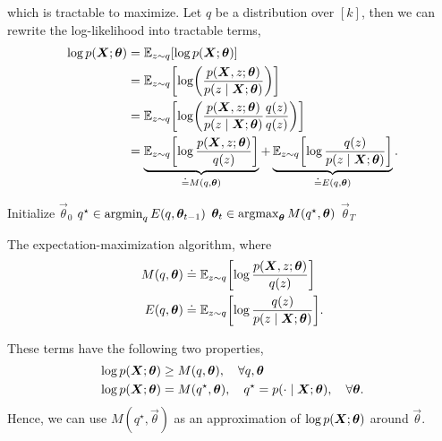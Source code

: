 which is tractable to maximize. Let $q$ be a distribution over $[k]$, then we can rewrite the
log-likelihood into tractable terms,
\begin{align*}
    \log p(\mat{X}; \vec{\theta}) & = \E_{z \sim q} [\log p(\mat{X}; \vec{\theta})]                                                                                                                                                                                            \\
                                  & = \E_{z \sim q} \lft[ \log \lft( \frac{p(\mat{X}, z; \vec{\theta})}{p(z \mid \mat{X}; \vec{\theta})} \rgt) \rgt]                                                                                                                           \\
                                  & = \E_{z \sim q} \lft[ \log \lft( \frac{p(\mat{X}, z; \vec{\theta})}{p(z \mid \mat{X}; \vec{\theta})} \frac{q(z)}{q(z)} \rgt) \rgt]                                                                                                         \\
                                  & = \underbrace{\E_{z \sim q} \lft[ \log \frac{p(\mat{X}, z; \vec{\theta})}{q(z)} \rgt]}_{\doteq M(q, \vec{\theta})} + \underbrace{\E_{z \sim q} \lft[ \log \frac{q(z)}{p(z \mid \mat{X}; \vec{\theta})} \rgt]}_{\doteq E(q, \vec{\theta})}.
\end{align*}

\begin{algorithm}[t]
    \begin{algorithmic}[1]
        \State Initialize $\vec{\theta}_0$
        \State $q^\star \in \operatorname*{argmin}_{q} E(q, \bm{\theta}_{t-1})$
        \State $\bm{\theta}_t \in \operatorname*{argmax}_{\bm{\theta}} M(q^\star, \bm{\theta})$
        \EndFor
        \State \Return $\vec{\theta}_T$
    \end{algorithmic}
    \caption{The expectation-maximization algorithm, where
        \begin{align*}
            M(q, \vec{\theta}) & \doteq \E_{z \sim q} \lft[ \log \frac{p(\mat{X}, z; \vec{\theta})}{q(z)} \rgt]      \\
            E(q, \vec{\theta}) & \doteq \E_{z \sim q} \lft[ \log \frac{q(z)}{p(z \mid \mat{X}; \vec{\theta})} \rgt].
        \end{align*}}
\end{algorithm}

These terms have the following two properties,
\begin{align*}
    \log p(\bm{X}; \bm{\theta}) & \geq M(q, \bm{\theta}), \quad \forall q, \bm{\theta}                                                       \\
    \log p(\bm{X}; \bm{\theta}) & = M(q^\star, \bm{\theta}), \quad q^\star = p(\cdot \mid \bm{X}; \bm{\theta}), \quad \forall \bm{\theta}.
\end{align*}
Hence, we can use $M(q^\star, \vec{\theta})$ as an approximation of $\log p(\bm{X}; \bm{\theta})$
around $\vec{\theta}$.

